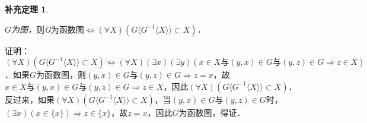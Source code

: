 \documentclass[12pt, a4paper, oneside]{book}
\newtheorem{cor}{补充定理}
\begin{document}
			\begin{cor}\label{cor69}
				\hfill\par
				$G$为图，$则$G$\text{为函数图}\Leftrightarrow (\forall X)(G\langle G^{-1}\langle X \rangle \rangle\subset X)$．
			\end{cor}
			证明：$(\forall X)(G\langle G^{-1}\langle X \rangle \rangle\subset X) \Leftrightarrow (\forall X)(\exists x)(\exists y)(x\in X\text{与}(y, x) \in G\text{与}(y, z)\in G\Rightarrow z\in X)$．如果$G$为函数图，则$(y, x)\in G\text{与}(y, z)\in G\Rightarrow z=x$，故$x\in X\text{与}(y, x)\in G\text{与}(y, z)\in G\Rightarrow z\in X$，因此$(\forall X)(G\langle G^{-1}\langle X \rangle \rangle\subset X)$．反过来，如果$(\forall X)(G\langle G^{-1}\langle X \rangle \rangle\subset X)$，当$(y, x)\in G\text{与}(y, z)\in G$时，$(\exists x)(x\in \{x\})\Rightarrow z\in \{x\}$，故$z=x$，因此$G$为函数图，得证．
			
\end{document}
